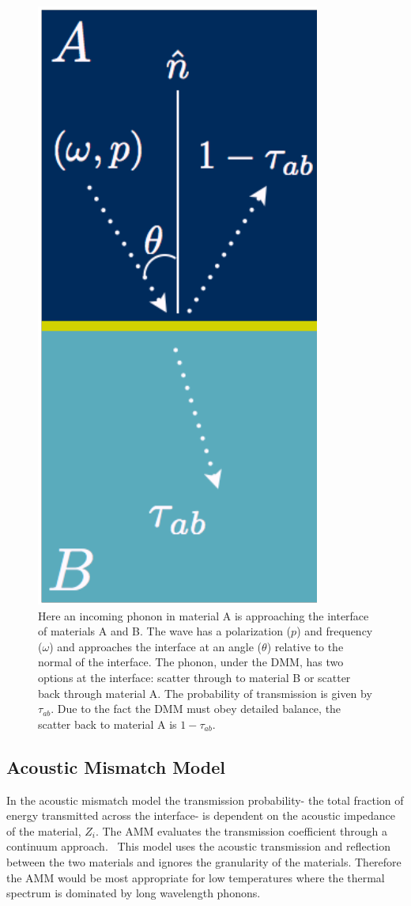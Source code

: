 \begin{figure}
    \centering
    \includegraphics[scale=0.75]{figures/interface-graphic.png}
    \caption{Here an incoming phonon in material A is approaching the interface of materials A and B. The wave has a polarization ($p$) and frequency ($\omega$) and approaches the interface at an angle ($\theta$) relative to the normal of the interface. The phonon, under the DMM, has two options at the interface: scatter through to material B or scatter back through material A. The probability of transmission is given by $\tau_{ab}$. Due to the fact the DMM must obey detailed balance, the scatter back to material A is $1 - \tau_{ab}$.}
    \label{fig:interface-graphic}
\end{figure}

\subsection{Acoustic Mismatch Model}
In the acoustic mismatch model the transmission probability- the total fraction of energy transmitted across the interface- is dependent on the acoustic impedance of the material, $Z_i$. The AMM evaluates the transmission coefficient through a continuum approach.~\cite{Little1959} This model uses the acoustic transmission and reflection between the two materials and ignores the granularity of the materials. Therefore the AMM would be most appropriate for low temperatures where the thermal spectrum is dominated by long wavelength phonons.~\cite{Graff1975} 

